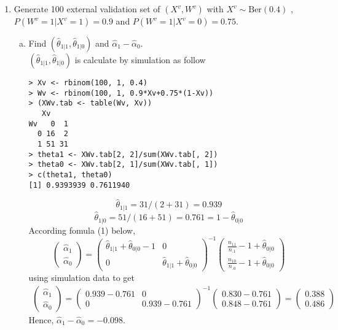 \begin{enumerate}
\begin{enumerate}[(a)]
\end{enumerate}
\item Generate 100 external validation set of $(X^v, W^v)$ with $X^v\sim \text{Ber}(0.4)$ , $P(W^v=1|X^v=1)=0.9$ and $P(W^v=1|X^v=0)=0.75$.
\begin{enumerate}[(a)]
\item Find $(\hat\theta_{1|1}, \hat\theta_{1|0})$ and $\hat\alpha_1-\hat\alpha_0$.\\
$(\hat\theta_{1|1}, \hat\theta_{1|0})$ is calculate by simulation as follow
\begin{lstlisting}
> Xv <- rbinom(100, 1, 0.4)
> Wv <- rbinom(100, 1, 0.9*Xv+0.75*(1-Xv))
> (XWv.tab <- table(Wv, Xv))
   Xv
Wv   0  1
  0 16  2
  1 51 31
> theta1 <- XWv.tab[2, 2]/sum(XWv.tab[, 2])
> theta0 <- XWv.tab[2, 1]/sum(XWv.tab[, 1])
> c(theta1, theta0)
[1] 0.9393939 0.7611940
\end{lstlisting}
\[\hat\theta_{1|1}=31/(2+31)= 0.939\]
\[\hat\theta_{1|0}=51/(16+51)= 0.761 = 1-\hat\theta_{0|0}\]
According fomula (1) below,
\begin{equation}
\begin{pmatrix}\hat\alpha_1\\\hat\alpha_0\end{pmatrix}=\begin{pmatrix}\hat\theta_{1|1}+\hat\theta_{0|0}-1 & 0 \\ 0 & \hat\theta_{1|1}+\hat\theta_{0|0}\end{pmatrix}^{-1}\begin{pmatrix}
\frac{n_{11}}{n_{.1}}-1+\hat\theta_{0|0} \\
\frac{n_{10}}{n_{.0}}-1+\hat\theta_{0|0}
\end{pmatrix}
\end{equation}
using simulation data to get
\[\begin{array}{rcl}
\begin{pmatrix}\hat\alpha_1\\\hat\alpha_0\end{pmatrix}=\begin{pmatrix}0.939-0.761 & 0 \\ 0 & 0.939-0.761\end{pmatrix}^{-1}\begin{pmatrix}0.830-0.761 \\0.848-0.761\end{pmatrix}=\begin{pmatrix}0.388 \\0.486\end{pmatrix}
\end{array}\]
Hence, $\hat\alpha_1-\hat\alpha_0=-0.098$.


\end{enumerate}
\end{enumerate}
